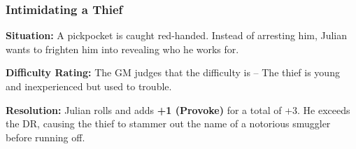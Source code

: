 \begin{DndReadAloud}{}
	\subsubsection{Intimidating a Thief}

	\textbf{Situation:} A pickpocket is caught red-handed. Instead of arresting him, Julian wants to frighten him into revealing who he works for.

	\noindent\textbf{Difficulty Rating:} The GM judges that the difficulty is \Basic – The thief is young and inexperienced but used to trouble.

	\noindent\textbf{Resolution:} Julian rolls  and adds \textbf{+1 (Provoke)} for a total of +3. He exceeds the DR, causing the thief to stammer out the name of a notorious smuggler before running off.
\end{DndReadAloud}
